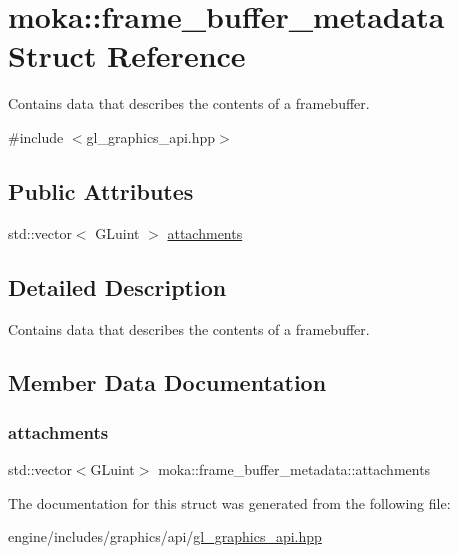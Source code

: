 \hypertarget{structmoka_1_1frame__buffer__metadata}{}\section{moka\+::frame\+\_\+buffer\+\_\+metadata Struct Reference}
\label{structmoka_1_1frame__buffer__metadata}


Contains data that describes the contents of a framebuffer.  




{\ttfamily \#include $<$gl\+\_\+graphics\+\_\+api.\+hpp$>$}

\subsection*{Public Attributes}
\begin{DoxyCompactItemize}
\item 
std\+::vector$<$ G\+Luint $>$ \mbox{\hyperlink{structmoka_1_1frame__buffer__metadata_a13b1b95f878ef7edabad657480de0b16}{attachments}}
\end{DoxyCompactItemize}


\subsection{Detailed Description}
Contains data that describes the contents of a framebuffer. 

\subsection{Member Data Documentation}
\mbox{\label{structmoka_1_1frame__buffer__metadata_a13b1b95f878ef7edabad657480de0b16}} 
\subsubsection{\texorpdfstring{attachments}{attachments}}
{\footnotesize\ttfamily std\+::vector$<$G\+Luint$>$ moka\+::frame\+\_\+buffer\+\_\+metadata\+::attachments}



The documentation for this struct was generated from the following file\+:\begin{DoxyCompactItemize}
\item 
engine/includes/graphics/api/\mbox{\hyperlink{gl__graphics__api_8hpp}{gl\+\_\+graphics\+\_\+api.\+hpp}}\end{DoxyCompactItemize}
